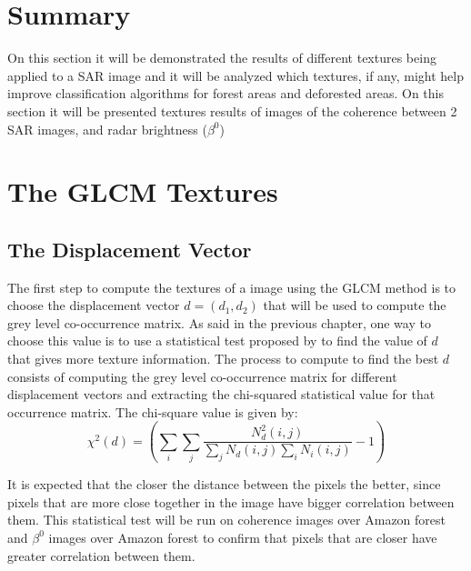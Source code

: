 
\section*{Summary}
On this section it will be demonstrated the results of different textures being applied to a SAR image and it will be analyzed which textures, if any, might help improve classification algorithms for forest areas and deforested areas. On this section it will be presented textures results of images of the coherence between 2 SAR images, and radar brightness ($\beta^0$)

\section{The GLCM Textures} 
\label{sec:gv1}

\subsection{The Displacement Vector}
\label{subsec:displacement_vector}
The first step to compute the textures of a image using the GLCM method is to choose the displacement vector $d=(d_1, d_2)$ that will be used to compute the grey level co-occurrence matrix. As said in the previous chapter, one way to choose this value is to use a statistical test proposed by \cite{Zucker} to find the value of $d$ that gives more texture information.
The process to compute to find the best $d$ consists of computing the grey level co-occurrence matrix for different displacement vectors and extracting the chi-squared statistical value for that occurrence matrix. The chi-square value is given by:
\begin{equation}
    \label{eq:test}
    \chi^2(d) = (\sum_i\sum_j \frac{N_d^2(i,j)}{\sum_jN_d(i,j)\sum_iN_i(i,j)} -1)
\end{equation}

It is expected that the closer the distance between the pixels the better, since pixels that are more close together in the image have bigger correlation between them. This statistical test will be run on coherence images over Amazon forest and $\beta^0$ images over Amazon forest to confirm that pixels that are closer have greater correlation between them.  

